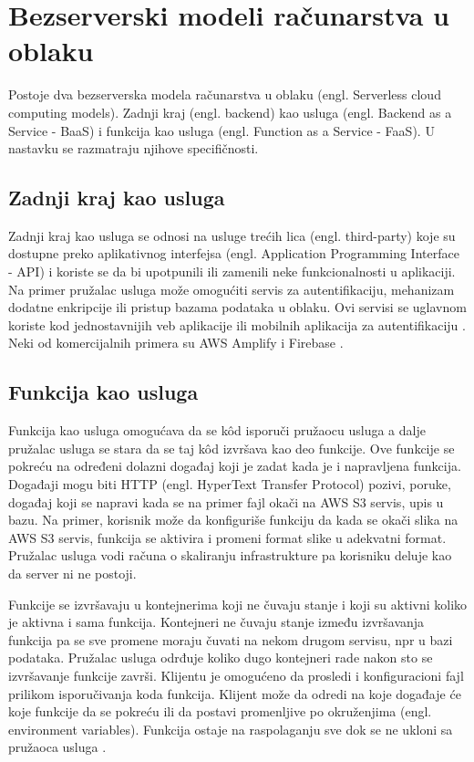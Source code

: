 \documentclass[12pt,oneside]{memoir}
\begin{document}
\section{Bezserverski modeli računarstva u oblaku}
Postoje dva bezserverska modela računarstva u oblaku (engl. Serverless cloud computing models). Zadnji kraj (engl. backend) kao usluga (engl. Backend as a Service - BaaS) i funkcija kao usluga (engl. Function as a Service - FaaS). U nastavku se razmatraju njihove specifičnosti.

\subsection{Zadnji kraj kao usluga}

Zadnji kraj kao usluga se odnosi na usluge trećih lica (engl. third-party) koje su dostupne preko aplikativnog interfejsa (engl. Application Programming Interface - API) i koriste se da bi upotpunili ili zamenili neke funkcionalnosti u aplikaciji. Na primer pružalac usluga može omogućiti servis za autentifikaciju, mehanizam dodatne enkripcije ili pristup bazama podataka u oblaku. Ovi servisi se uglavnom koriste kod jednostavnijih veb aplikacije ili mobilnih aplikacija za autentifikaciju \cite{wis} \cite{bsa}. Neki od komercijalnih primera su AWS Amplify i Firebase \cite{baasp}.

\subsection{Funkcija kao usluga}
Funkcija kao usluga omogućava da se kôd isporuči pružaocu usluga a dalje pružalac usluga se stara da se taj kôd izvršava kao deo funkcije. Ove funkcije se pokreću na određeni dolazni događaj koji je zadat kada je i napravljena funkcija. Događaji mogu biti HTTP (engl. HyperText Transfer Protocol) pozivi, poruke, događaj koji se napravi kada se na primer fajl okači na AWS S3 servis, upis u bazu. Na primer, korisnik može da konfiguriše funkciju da kada se okači slika na AWS S3 servis, funkcija se aktivira i promeni format slike u adekvatni format. Pružalac usluga vodi računa o skaliranju infrastrukture pa korisniku deluje kao da server ni ne postoji. 

Funkcije se izvršavaju u kontejnerima koji ne čuvaju stanje i koji su aktivni koliko je aktivna i sama funkcija. Kontejneri ne čuvaju stanje između izvršavanja funkcija pa se sve promene moraju čuvati na nekom drugom servisu, npr u bazi podataka. Pružalac usluga odrđuje koliko dugo kontejneri rade nakon sto se izvršavanje funkcije završi. Klijentu je omogućeno da prosledi i konfiguracioni fajl prilikom isporučivanja koda funkcija. Klijent može da odredi na koje događaje će koje funkcije da se pokreću ili da postavi promenljive po okruženjima (engl. environment variables). Funkcija ostaje na raspolaganju sve dok se ne ukloni sa pružaoca usluga \cite{bsa}.
\end{document}
